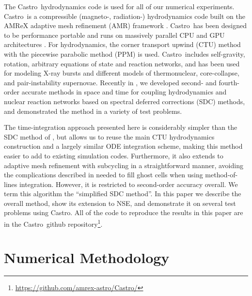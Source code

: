 \documentclass[times,modern]{aastex63}
\newcommand{\castro}{{\sf Castro}}
\begin{document}
The \castro\ hydrodynamics code \citep{castro,castro_joss} is used for
all of our numerical experiments.  \castro\ is a compressible
(magneto-, radiation-) hydrodynamics code built on the AMReX adaptive
mesh refinement (AMR) framework \citep{amrex_joss}.  \castro\ has been
designed to be performance portable and runs on massively parallel CPU
and GPU architectures \citep{castro_gpu}.  For hydrodynamics, the
corner transport upwind (CTU) \citep{ppmunsplit} method with the
piecewise parabolic method (PPM) \citep{ppm,millercolella:2002} is
used.  \castro\ includes self-gravity, rotation, arbitrary equations
of state and reaction networks, and has been used for modeling X-ray
bursts and different models of thermonuclear, core-collapse, and
pair-instability supernovae.  Recently in \citet{castro_sdc}, we
developed second- and fourth-order accurate methods in space and time
for coupling hydrodynamics and nuclear reaction networks based on
spectral deferred corrections (SDC) methods, and demonstrated the
method in a variety of test problems.

The time-integration approach presented here is considerably simpler than
the SDC method of \citet{castro_sdc}, but allows us to reuse the main CTU
hydrodynamics construction and a largely similar ODE integration
scheme, making this method easier to add to existing simulation codes.
Furthermore, it also extends to adaptive mesh refinement with
subcycling in a straightforward manner, avoiding the complications
described in \citep{mccorquodalecolella} needed to fill ghost cells
when using method-of-lines integration.  However, it is restricted to
second-order accuracy overall.  We term this algorithm the
``simplified SDC method''.  In this paper we describe the overall method, show its extension to NSE,
and demonstrate it on several test problems using \castro.  All of the
code to reproduce the results in this paper are in the \castro\ github
repository\footnote{\url{https://github.com/amrex-astro/Castro/}}.

\section{Numerical Methodology}
\end{document}
